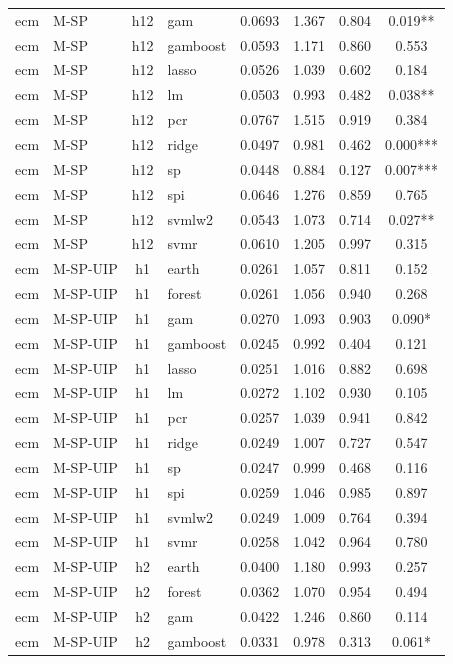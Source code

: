 \begin{ThreePartTable}
\begin{longtable}[t]{llclcccc}
ecm & M-SP & h12 & gam & 0.0693 & 1.367 & 0.804 & 0.019**\\
ecm & M-SP & h12 & gamboost & 0.0593 & 1.171 & 0.860 & 0.553\\
ecm & M-SP & h12 & lasso & 0.0526 & 1.039 & 0.602 & 0.184\\
ecm & M-SP & h12 & lm & 0.0503 & 0.993 & 0.482 & 0.038**\\
ecm & M-SP & h12 & pcr & 0.0767 & 1.515 & 0.919 & 0.384\\
ecm & M-SP & h12 & ridge & 0.0497 & 0.981 & 0.462 & 0.000***\\
ecm & M-SP & h12 & sp & 0.0448 & 0.884 & 0.127 & 0.007***\\
ecm & M-SP & h12 & spi & 0.0646 & 1.276 & 0.859 & 0.765\\
ecm & M-SP & h12 & svmlw2 & 0.0543 & 1.073 & 0.714 & 0.027**\\
ecm & M-SP & h12 & svmr & 0.0610 & 1.205 & 0.997 & 0.315\\
\addlinespace
ecm & M-SP-UIP & h1 & earth & 0.0261 & 1.057 & 0.811 & 0.152\\
ecm & M-SP-UIP & h1 & forest & 0.0261 & 1.056 & 0.940 & 0.268\\
ecm & M-SP-UIP & h1 & gam & 0.0270 & 1.093 & 0.903 & 0.090*\\
ecm & M-SP-UIP & h1 & gamboost & 0.0245 & 0.992 & 0.404 & 0.121\\
ecm & M-SP-UIP & h1 & lasso & 0.0251 & 1.016 & 0.882 & 0.698\\
ecm & M-SP-UIP & h1 & lm & 0.0272 & 1.102 & 0.930 & 0.105\\
ecm & M-SP-UIP & h1 & pcr & 0.0257 & 1.039 & 0.941 & 0.842\\
ecm & M-SP-UIP & h1 & ridge & 0.0249 & 1.007 & 0.727 & 0.547\\
ecm & M-SP-UIP & h1 & sp & 0.0247 & 0.999 & 0.468 & 0.116\\
ecm & M-SP-UIP & h1 & spi & 0.0259 & 1.046 & 0.985 & 0.897\\
ecm & M-SP-UIP & h1 & svmlw2 & 0.0249 & 1.009 & 0.764 & 0.394\\
ecm & M-SP-UIP & h1 & svmr & 0.0258 & 1.042 & 0.964 & 0.780\\
\addlinespace
ecm & M-SP-UIP & h2 & earth & 0.0400 & 1.180 & 0.993 & 0.257\\
ecm & M-SP-UIP & h2 & forest & 0.0362 & 1.070 & 0.954 & 0.494\\
ecm & M-SP-UIP & h2 & gam & 0.0422 & 1.246 & 0.860 & 0.114\\
ecm & M-SP-UIP & h2 & gamboost & 0.0331 & 0.978 & 0.313 & 0.061*\\

\end{longtable}
\end{ThreePartTable}
